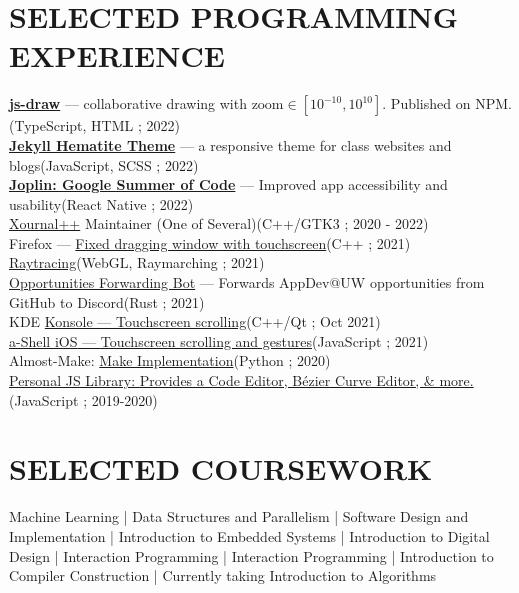 \documentclass[12pt,letterpaper]{extarticle}
\begin{document}
  \section{SELECTED PROGRAMMING EXPERIENCE}
  \newcommand\prExpEntry[3]{\textrm{#1}\hfill \small(#2 ; #3) \\}
  \prExpEntry{\textbf{\href{https://www.npmjs.com/package/js-draw}{js-draw}} — \footnotesize collaborative drawing with $\textrm{zoom} \in [10^{-10}, 10^{10}]$. Published on NPM.}{TypeScript, HTML}{2022}
  \prExpEntry{\textbf{\href{https://personalizedrefrigerator.github.io/jekyll-hematite-theme/}{Jekyll Hematite Theme}} — \footnotesize a responsive theme for class websites and blogs}{\small JavaScript, SCSS }{2022}
  \prExpEntry{\textbf{\href{https://henry-heino.web.app/2022/09/05/gsoc-final-reflection/}{Joplin: Google Summer of Code}} — \footnotesize Improved app accessibility and usability}{\small React Native}{2022}
  \prExpEntry{\href{https://github.com/xournalpp/xournalpp}{Xournal++} Maintainer (One of Several)}{C++/GTK3}{2020 - 2022}
  \prExpEntry{Firefox --- \href{https://phabricator.services.mozilla.com/D129349}{Fixed dragging window with touchscreen}}{C++}{2021}
  \prExpEntry{\href{https://shadertoy.com/user/personalizedrefrigerator}{Raytracing}}{WebGL, Raymarching}{2021}
  \prExpEntry{\href{https://github.com/UWAppDev/opportunities-forwarding-bot}{Opportunities Forwarding Bot} --- {\footnotesize Forwards AppDev@UW opportunities from GitHub to Discord}}{Rust}{2021}
  \prExpEntry{KDE \href{https://invent.kde.org/utilities/konsole/-/merge_requests/516}{Konsole --- {\footnotesize Touchscreen scrolling}}}{C++/Qt}{Oct 2021}
  \prExpEntry{\href{https://github.com/holzschu/a-shell/pull/246}{{a-Shell iOS} --- {\footnotesize Touchscreen scrolling and gestures}}}{JavaScript}{2021}
  \prExpEntry{Almost-Make: \href{https://github.com/personalizedrefrigerator/AlmostMake}{Make Implementation}}{Python}{2020}
  \prExpEntry{\href{https://github.com/personalizedrefrigerator/LibJS}{{\footnotesize Personal JS Library:} {\small Provides a Code Editor, Bézier Curve Editor, \& more.}}}{JavaScript}{2019-2020}

  \section{SELECTED COURSEWORK}
  \begin{addmargin}[2em]{2em}
    \def\cseRf#1#2{{#2}}
    \def\cseSp{ | }
    \small

    \cseRf{446}{Machine Learning}
    \cseSp{}\cseRf{332}{Data Structures and Parallelism}
    \cseSp{}\cseRf{331}{Software Design and Implementation}
    \cseSp{}\cseRf{474}{Introduction to Embedded Systems}
    \cseSp{}\cseRf{369}{Introduction to Digital Design}
    \cseSp{}\cseRf{340}{Interaction Programming}
    \cseSp{}\cseRf{340}{Interaction Programming}
    \cseSp{}\cseRf{401}{Introduction to Compiler Construction}
    \cseSp{} Currently taking \cseRf{421}{Introduction to Algorithms}
  \end{addmargin}
\end{document}
